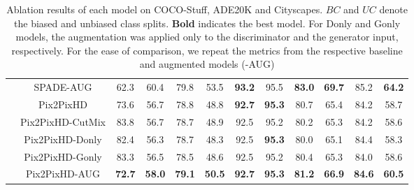 \documentclass[final]{cvpr}
\newcommand\+{\mkern4mu}
\begin{document}
\begin{table*}[h]
{\begin{tabular}{@{}lc@{\hspace{0.3cm}}c@{\hspace{0.7cm}}ccc@{\hspace{0.7cm}}ccc@{\hspace{0.7cm}}ccc@{}}
			& \small SPADE-AUG & \small 62.3 & \small 60.4 & \small 79.8 & \small 53.5 & \small \textbf{93.2} & \small 95.5 & \small \textbf{83.0} & \small \textbf{69.7} & \small 85.2 & \small \textbf{64.2} \tabularnewline[0.2cm] 
			


			& \small Pix2PixHD & \small 73.6 & \small 56.7& \small 78.8& \small 48.8 & \small \textbf{92.7} & \small \textbf{95.3} & \small 80.7 & \small 65.4 & \small 84.2 & \small 58.7 \tabularnewline
			
			& \small Pix2PixHD-CutMix & \small 83.8 & \small 56.7 & \small	78.7 & \small 48.9 & \small	92.5 & \small	95.2 & \small	80.2 & \small 65.3 & \small	84.2 & \small	58.6 \tabularnewline
			
			& \small Pix2PixHD-Donly & \small 82.4 & \small	56.3 & \small	78.7 & \small 48.3 & \small 92.5 & \small \textbf{95.3} & \small 80.0 & \small	65.1 & \small 84.4 & \small	58.3 \tabularnewline
			& \small Pix2PixHD-Gonly & \small 83.3 & \small	56.5 & \small	78.5 & \small 48.6 & \small	92.5 & \small 95.2 & \small	80.4 & \small	65.3 & \small 84.0 & \small 58.6 \tabularnewline	
			
			& \small Pix2PixHD-AUG & \small \textbf{72.7} & \small \textbf{58.0} & \small \textbf{79.1} & \small \textbf{50.5} & \small \textbf{92.7} & \small \textbf{95.3} & \small \textbf{81.2} & \small \textbf{66.9} & \small \textbf{84.6} & \small \textbf{60.5} \tabularnewline 
		\end{tabular}}
	\vspace{0.5em}
	\caption{Ablation results of each model on COCO-Stuff, ADE20K and Cityscapes. ${BC}$ and ${UC}$ denote the biased and unbiased class splits. \textbf{Bold} indicates the best model. For Donly and Gonly models, the augmentation was applied only to the discriminator and the generator input, respectively. For the ease of comparison, we repeat the metrics from the respective baseline and augmented models (-AUG)}
	\label{tab:cutmix_selective_augmentation_ablations}
\end{table*}
\clearpage
 
\end{document}
